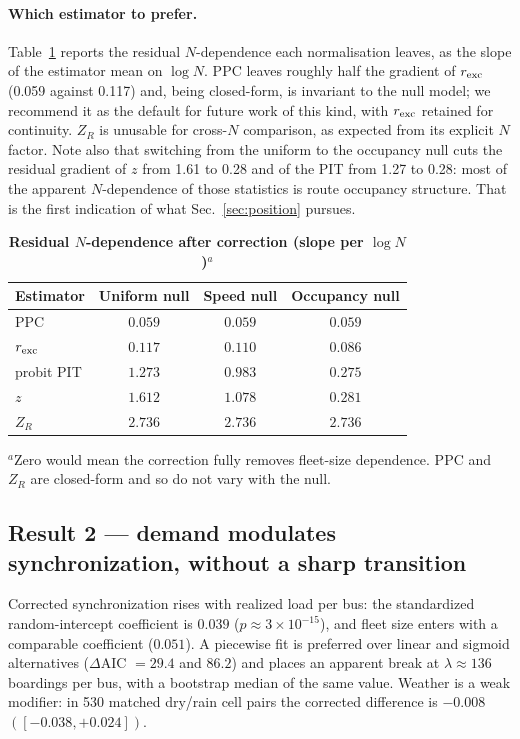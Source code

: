 \documentclass[9pt,twocolumn,twoside]{opticajnl}
\begin{document}
\paragraph{Which estimator to prefer.} Table~\ref{tab:gradient} reports the residual
$N$-dependence each normalisation leaves, as the slope of the estimator mean on $\log N$. PPC
leaves roughly half the gradient of $r_{\rm exc}$ (0.059 against 0.117) and, being closed-form,
is invariant to the null model; we recommend it as the default for future work of this kind,
with $r_{\rm exc}$ retained for continuity. $Z_R$ is unusable for cross-$N$ comparison, as
expected from its explicit $N$ factor. Note also that switching from the uniform to the
occupancy null cuts the residual gradient of $z$ from 1.61 to 0.28 and of the PIT from 1.27 to
0.28: most of the apparent $N$-dependence of those statistics is route occupancy structure. That
is the first indication of what Sec.~\ref{sec:position} pursues.

\begin{table}[t]
\centering
\caption{\bf Residual $N$-dependence after correction (slope per $\log N$)$^{a}$}
\small
\setlength{\tabcolsep}{3.2pt}
\begin{tabular}{lccc}
\toprule
Estimator & Uniform null & Speed null & Occupancy null \\
\midrule
PPC            & $0.059$ & $0.059$ & $0.059$ \\
$r_{\rm exc}$  & $0.117$ & $0.110$ & $0.086$ \\
probit PIT     & $1.273$ & $0.983$ & $0.275$ \\
$z$            & $1.612$ & $1.078$ & $0.281$ \\
$Z_R$          & $2.736$ & $2.736$ & $2.736$ \\
\bottomrule
\end{tabular}
\label{tab:gradient}

\smallskip
$^{a}$Zero would mean the correction fully removes fleet-size dependence. PPC and $Z_R$ are
closed-form and so do not vary with the null.
\end{table}

\subsection{Result 2 --- demand modulates synchronization, without a sharp
transition}\label{sec:crossover}

Corrected synchronization rises with realized load per bus: the standardized random-intercept
coefficient is $0.039$ ($p \approx 3\times10^{-15}$), and fleet size enters with a comparable
coefficient ($0.051$). A piecewise fit is preferred over linear and sigmoid alternatives
($\Delta$AIC $=29.4$ and $86.2$) and places an apparent break at $\lambda \approx 136$
boardings per bus, with a bootstrap median of the same value. Weather is a weak modifier: in
530 matched dry/rain cell pairs the corrected difference is $-0.008$ $([-0.038, +0.024])$.
\end{document}
